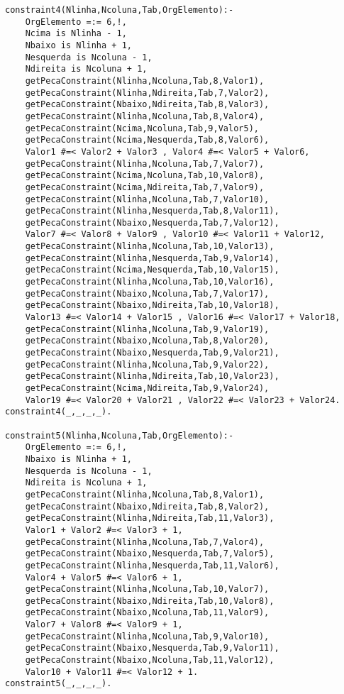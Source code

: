 \documentclass[runningheads]{llncs}
\begin{document}
\begin{lstlisting}
constraint4(Nlinha,Ncoluna,Tab,OrgElemento):-
    OrgElemento =:= 6,!,
    Ncima is Nlinha - 1,
    Nbaixo is Nlinha + 1,
    Nesquerda is Ncoluna - 1,
    Ndireita is Ncoluna + 1,
    getPecaConstraint(Nlinha,Ncoluna,Tab,8,Valor1),
    getPecaConstraint(Nlinha,Ndireita,Tab,7,Valor2),
    getPecaConstraint(Nbaixo,Ndireita,Tab,8,Valor3),
    getPecaConstraint(Nlinha,Ncoluna,Tab,8,Valor4),
    getPecaConstraint(Ncima,Ncoluna,Tab,9,Valor5),
    getPecaConstraint(Ncima,Nesquerda,Tab,8,Valor6),
    Valor1 #=< Valor2 + Valor3 , Valor4 #=< Valor5 + Valor6,
    getPecaConstraint(Nlinha,Ncoluna,Tab,7,Valor7),
    getPecaConstraint(Ncima,Ncoluna,Tab,10,Valor8),
    getPecaConstraint(Ncima,Ndireita,Tab,7,Valor9),
    getPecaConstraint(Nlinha,Ncoluna,Tab,7,Valor10),
    getPecaConstraint(Nlinha,Nesquerda,Tab,8,Valor11),
    getPecaConstraint(Nbaixo,Nesquerda,Tab,7,Valor12),
    Valor7 #=< Valor8 + Valor9 , Valor10 #=< Valor11 + Valor12,
    getPecaConstraint(Nlinha,Ncoluna,Tab,10,Valor13),
    getPecaConstraint(Nlinha,Nesquerda,Tab,9,Valor14),
    getPecaConstraint(Ncima,Nesquerda,Tab,10,Valor15),
    getPecaConstraint(Nlinha,Ncoluna,Tab,10,Valor16),
    getPecaConstraint(Nbaixo,Ncoluna,Tab,7,Valor17),
    getPecaConstraint(Nbaixo,Ndireita,Tab,10,Valor18),
    Valor13 #=< Valor14 + Valor15 , Valor16 #=< Valor17 + Valor18,
    getPecaConstraint(Nlinha,Ncoluna,Tab,9,Valor19),
    getPecaConstraint(Nbaixo,Ncoluna,Tab,8,Valor20),
    getPecaConstraint(Nbaixo,Nesquerda,Tab,9,Valor21),
    getPecaConstraint(Nlinha,Ncoluna,Tab,9,Valor22),
    getPecaConstraint(Nlinha,Ndireita,Tab,10,Valor23),
    getPecaConstraint(Ncima,Ndireita,Tab,9,Valor24),
    Valor19 #=< Valor20 + Valor21 , Valor22 #=< Valor23 + Valor24.
constraint4(_,_,_,_).

constraint5(Nlinha,Ncoluna,Tab,OrgElemento):-
    OrgElemento =:= 6,!,
    Nbaixo is Nlinha + 1,
    Nesquerda is Ncoluna - 1,
    Ndireita is Ncoluna + 1,
    getPecaConstraint(Nlinha,Ncoluna,Tab,8,Valor1),
    getPecaConstraint(Nbaixo,Ndireita,Tab,8,Valor2),
    getPecaConstraint(Nlinha,Ndireita,Tab,11,Valor3),
    Valor1 + Valor2 #=< Valor3 + 1,
    getPecaConstraint(Nlinha,Ncoluna,Tab,7,Valor4),
    getPecaConstraint(Nbaixo,Nesquerda,Tab,7,Valor5),
    getPecaConstraint(Nlinha,Nesquerda,Tab,11,Valor6),
    Valor4 + Valor5 #=< Valor6 + 1,
    getPecaConstraint(Nlinha,Ncoluna,Tab,10,Valor7),
    getPecaConstraint(Nbaixo,Ndireita,Tab,10,Valor8),
    getPecaConstraint(Nbaixo,Ncoluna,Tab,11,Valor9),
    Valor7 + Valor8 #=< Valor9 + 1,
    getPecaConstraint(Nlinha,Ncoluna,Tab,9,Valor10),
    getPecaConstraint(Nbaixo,Nesquerda,Tab,9,Valor11),
    getPecaConstraint(Nbaixo,Ncoluna,Tab,11,Valor12),
    Valor10 + Valor11 #=< Valor12 + 1.
constraint5(_,_,_,_).


\end{lstlisting}
\end{document}
